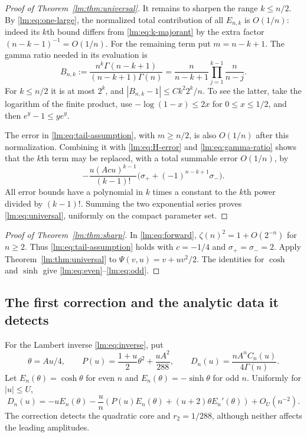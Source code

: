 \begin{proof}[Proof of Theorem~\ref{lm:thm:universal}]
It remains to sharpen the range $k\leq n/2$.  By
\eqref{lm:eq:one-large}, the normalized total contribution of all
$E_{n,k}$ is $O(1/n)$: indeed its $k$th bound differs from
\eqref{lm:eq:k-majorant} by the extra factor
$(n-k-1)^{-1}=O(1/n)$.  For the remaining term put $m=n-k+1$.
The gamma ratio needed in its evaluation is
\begin{equation}\label{lm:eq:gamma-ratio}
 B_{n,k}:=\frac{n^k\Gamma(n-k+1)}{(n-k+1)\Gamma(n)}
 =\frac n{n-k+1}\prod_{j=1}^{k-1}\frac n{n-j}.
\end{equation}
For $k\leq n/2$ it is at most $2^k$, and
$|B_{n,k}-1|\leq Ck^2 2^k/n$.  To see the latter, take the logarithm
of the finite product, use $-\log(1-x)\leq2x$ for $0\leq x\leq1/2$,
and then $e^y-1\leq ye^y$.

The error in \eqref{lm:eq:tail-assumption}, with $m\geq n/2$, is
also $O(1/n)$ after this normalization.  Combining it with
\eqref{lm:eq:H-error} and \eqref{lm:eq:gamma-ratio} shows that the
$k$th term may be replaced, with a total summable error $O(1/n)$, by
\[
 -\frac{u(Acu)^{k-1}}{(k-1)!}
       \bigl(\sigma_++(-1)^{n-k+1}\sigma_-\bigr).
\]
All error bounds have a polynomial in $k$ times a constant to the
$k$th power divided by $(k-1)!$.  Summing the two exponential series
proves \eqref{lm:eq:universal}, uniformly on the compact parameter set.
\end{proof}

\begin{proof}[Proof of Theorem~\ref{lm:thm:sharp}]
In \eqref{lm:eq:forward}, $\zeta(n)^2=1+O(2^{-n})$ for $n\geq2$.
Thus \eqref{lm:eq:tail-assumption} holds with $c=-1/4$ and
$\sigma_+=\sigma_-=2$.  Apply Theorem~\ref{lm:thm:universal} to
$\Psi(v,u)=v+uv^2/2$.  The identities for $\cosh$ and $\sinh$ give
\eqref{lm:eq:even}--\eqref{lm:eq:odd}.
\end{proof}

\subsection{The first correction and the analytic data it detects}
\label{lm:subsec:first}

\begin{theorem}\label{lm:thm:first}
For the Lambert inverse \eqref{lm:eq:inverse}, put
\begin{equation}\label{lm:eq:theta-H}
 \theta=Au/4,\qquad
 P(u)=\frac{1+u}{2}\theta^2+\frac{uA^2}{288},\qquad
 D_n(u)=\frac{nA^nC_n(u)}{4\Gamma(n)}.
\end{equation}
Let $E_n(\theta)=\cosh\theta$ for even $n$ and
$E_n(\theta)=-\sinh\theta$ for odd $n$.  Uniformly for $|u|\leq U$,
\begin{equation}\label{lm:eq:first}
 D_n(u)=-uE_n(\theta)
 -\frac un\left(P(u)E_n(\theta)+(u+2)\theta E_n'(\theta)\right)
 +O_U(n^{-2}).
\end{equation}
The correction detects the quadratic core and $r_2=1/288$, although
neither affects the leading amplitudes.
\end{theorem}


